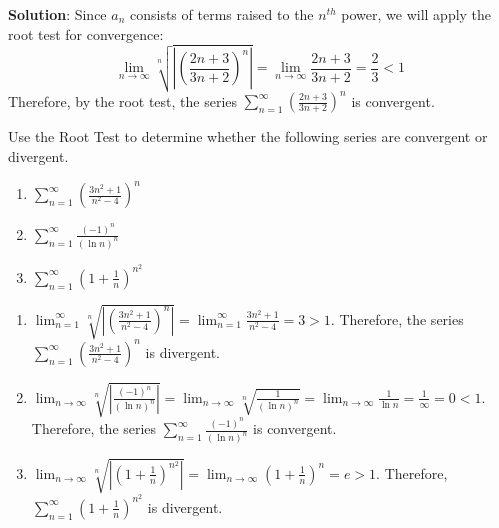 \textbf{Solution}: Since $a_n$ consists of terms raised to the $n^{th}$ power, 
we will apply the root test for convergence:
$$\lim_{n \to \infty} \sqrt[n]{\left| \left( \frac{2n+3}{3n+2} \right)^n 
\right|} = \lim_{n \to \infty} \frac{2n+3}{3n+2} = \frac{2}{3} < 1$$ 
Therefore, by the root test, the series $\sum_{n=1}^\infty \left( \frac{2n + 
3}{3n + 2} \right)^n$ is convergent. 

\begin{Exercise}[label=root1]
Use the Root Test to determine whether the following series are convergent or 
divergent.
\begin{enumerate}
\item $\sum_{n=1}^\infty \left( \frac{3n^2 + 1}{n^2 - 4} \right)^n$
\item $\sum_{n=1}^\infty \frac{(-1)^{n}}{(\ln{n})^n}$
\item $\sum_{n=1}^\infty \left( 1+ \frac{1}{n} \right)^{n^2}$
\end{enumerate}
\end{Exercise}

\begin{Answer}
\begin{enumerate}
\item $\lim_{n=1}^\infty \sqrt[n]{\left| \left( \frac{3n^2 + 1}{n^2 - 4} \right)^n 
\right|} = \lim_{n=1}^\infty \frac{3n^2 + 1}{n^2 - 4} = 3 >1$. Therefore, 
the series $\sum_{n=1}^\infty \left( \frac{3n^2 + 1}{n^2 - 4} \right)^n$ is 
divergent.
\item $\lim_{n \to \infty} \sqrt[n]{\left| \frac{(-1)^{n}}{(\ln{n})^n} \right|} 
= \lim_{n \to \infty} \sqrt[n]{\frac{1}{(\ln{n})^n}} = \lim_{n \to \infty} 
\frac{1}{\ln{n}} = \frac{1}{\infty} = 0 < 1$. Therefore, the series $\sum_
{n=1}^\infty \frac{(-1)^{n}}{(\ln{n})^n}$ is convergent.
\item $\lim_{n \to \infty} \sqrt[n]{\left| \left( 1 + \frac{1}{n} \right)^{n^2} 
\right|} = \lim_{n \to \infty} \left(1 + \frac{1}{n} \right)^n = e > 1$. 
Therefore, $\sum_{n=1}^\infty \left( 1+ \frac{1}{n} \right)^{n^2}$ is divergent. 
\end{enumerate}
\end{Answer}

